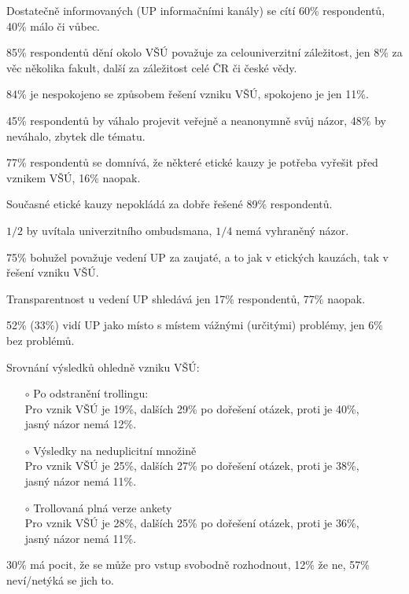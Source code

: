\documentclass[a4paper,twoside]{article}
\begin{document}
\begin{itemize}
  \item Dostatečně informovaných (UP informačními kanály) se cítí 60\% respondentů, 40\% málo či vůbec.
  \item 85\% respondentů  dění okolo VŠÚ považuje za celouniverzitní záležitost, jen 8\% za věc několika fakult, další za záležitost celé ČR či české vědy.
  \item 84\% je nespokojeno se způsobem řešení vzniku VŠÚ, spokojeno je jen 11\%.
  \item 45\% respondentů by váhalo projevit veřejně a neanonymně svůj názor, 48\% by neváhalo, zbytek dle tématu.
  \item 77\% respondentů se domnívá, že některé etické kauzy je potřeba vyřešit před vznikem VŠÚ, 16\% naopak.
  \item Současné etické kauzy nepokládá za dobře řešené 89\% respondentů.
  \item $1/2$ by uvítala univerzitního ombudsmana, $1/4$ nemá vyhraněný názor.
  \item 75\% bohužel považuje vedení UP za zaujaté, a to jak v etických kauzách, tak v řešení vzniku VŠÚ.
  \item Transparentnost u vedení UP shledává jen 17\% respondentů, 77\% naopak.
  \item 52\% (33\%) vidí UP jako místo s místem vážnými (určitými) problémy, jen 6\% bez problémů.
{\bf 
  \item Srovnání výsledků ohledně vzniku VŠÚ:
    \begin{itemize} 
      \item[$\circ$] Po odstranění trollingu:
      \\ Pro vznik VŠÚ je 19\%, dalších 29\% po dořešení otázek, proti je 40\%, \\ jasný názor nemá 12\%.
      \item[$\circ$] Výsledky na neduplicitní množině
      \\ Pro vznik VŠÚ je 25\%, dalších 27\% po dořešení otázek, proti je 38\%, \\ jasný názor nemá 11\%.
      \item[$\circ$] Trollovaná plná verze ankety
      \\ Pro vznik VŠÚ je 28\%, dalších 25\% po dořešení otázek, proti je 36\%, \\ jasný názor nemá 11\%.
    \end{itemize}
}
  \item 30\% má pocit, že se může pro vstup svobodně rozhodnout, 12\% že ne, 57\% neví/netýká se jich to.

\end{itemize}
\end{document}
